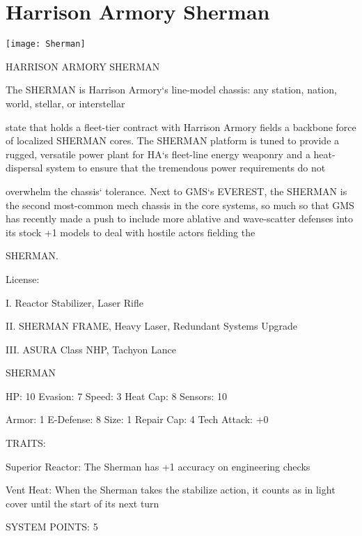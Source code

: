 \section{Harrison Armory Sherman}

\begin{center}
    \texttt{[image: Sherman]}
\end{center}

                              HARRISON ARMORY SHERMAN

The SHERMAN is Harrison Armory‘s line-model chassis: any station, nation, world, stellar, or interstellar

state that holds a fleet-tier contract with Harrison Armory fields a backbone force of localized SHERMAN
cores. The SHERMAN platform is tuned to provide a rugged, versatile power plant for HA‘s fleet-line
energy weaponry and a heat-dispersal system to ensure that the tremendous power requirements do not

overwhelm the chassis‘ tolerance. Next to GMS‘s EVEREST, the SHERMAN is the second most-common
mech chassis in the core systems, so much so that GMS has recently made a push to include more
ablative and wave-scatter defenses into its stock +1 models to deal with hostile actors fielding the

SHERMAN.

                                                  License:

I. Reactor Stabilizer, Laser Rifle

II. SHERMAN FRAME, Heavy Laser, Redundant Systems Upgrade

III. ASURA Class NHP, Tachyon Lance


                                                SHERMAN

 HP: 10         Evasion: 7                            Speed: 3           Heat Cap: 8       Sensors: 10

 Armor: 1       E-Defense: 8                          Size: 1            Repair Cap: 4     Tech Attack:
                                                                                           +0

                                                  TRAITS:

 Superior Reactor: The Sherman has +1 accuracy on engineering checks

 Vent Heat: When the Sherman takes the stabilize action, it counts as in light cover until the start of its
 next turn

                                            SYSTEM POINTS: 5


